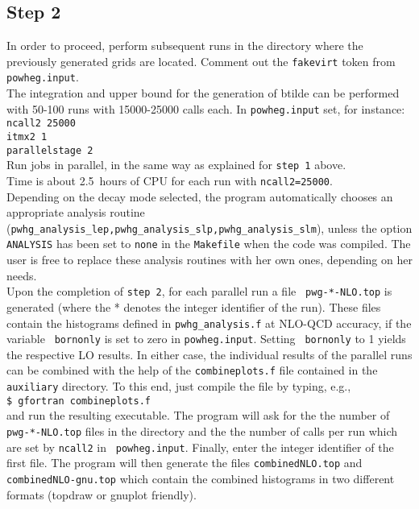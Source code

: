 \documentclass[a4paper,11pt]{article}
\begin{document}
\subsection*{Step 2}
%
In order to proceed, perform subsequent runs in the directory where the previously generated grids are located.
%
Comment out the {\tt fakevirt} token from {\tt powheg.input}. 
\\[2ex]
The integration and upper bound for the generation of btilde can be
performed with 50-100 runs with 15000-25000 calls each. In {\tt powheg.input} set, for instance:
\\[2ex]
{\tt ncall2 25000}
\\
{\tt itmx2 1}
\\
{\tt parallelstage  2}
\\[2ex]
Run jobs in parallel, in the same way as explained for {\tt step 1} above. 
\\[2ex]
Time is about 2.5~hours of CPU for each run with {\tt ncall2=25000}.
\\[2ex]
Depending on the decay mode selected, the program automatically chooses an appropriate analysis routine ({\tt pwhg\_analysis\_lep,pwhg\_analysis\_slp,pwhg\_analysis\_slm}), unless the option {\tt ANALYSIS} has been set to {\tt none} in the {\tt Makefile} when the code was compiled. The user is free to replace these analysis routines with her own ones, depending on her needs.  
\\[2ex]
Upon the completion of {\tt step 2}, for each parallel run a file {\tt
  pwg-*-NLO.top} is generated (where the * denotes the integer
identifier of the run).  These files contain the histograms defined in
{\tt pwhg\_analysis.f} at NLO-QCD accuracy, if the variable {\tt
  bornonly} is set to zero in {\tt powheg.input}.  Setting {\tt
  bornonly} to 1 yields the respective LO results. In either case, the
individual results of the parallel runs can be combined with the help
of the {\tt combineplots.f} file contained in the {\tt auxiliary}
directory.  To this end, just compile the file by typing, e.g.,
\\[2ex]
{\tt \$ gfortran combineplots.f}
\\[2ex]
and run the resulting executable. The program will ask for the the
number of {\tt pwg-*-NLO.top} files in the directory and the the number
of calls per run which are set by {\tt ncall2} in {\tt
  powheg.input}. Finally, enter the integer identifier of the first
file. The program will then generate the files {\tt combinedNLO.top}
and {\tt combinedNLO-gnu.top} which contain the combined histograms
in two different formats (topdraw or gnuplot friendly). 
\end{document}
